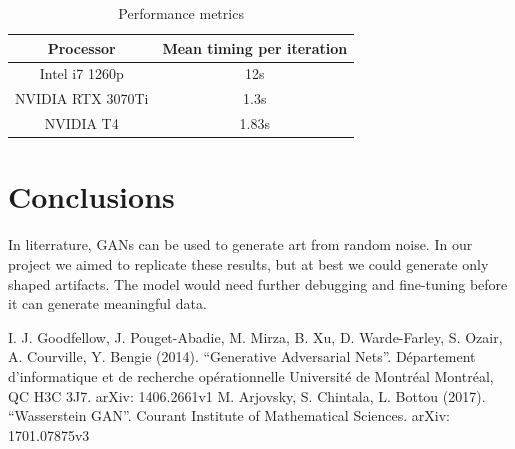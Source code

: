 \documentclass[conference]{IEEEtran}
\begin{document}
\begin{table}[!h]
    \centering
    \begin{tabular}{|c|c|}
        \hline
        Processor & Mean timing per iteration \\
        \hline
        Intel i7 1260p & 12s \\
        NVIDIA RTX 3070Ti & 1.3s \\
        NVIDIA T4 & 1.83s \\
        \hline
    \end{tabular}
    \caption{Performance metrics} \label{performance metrics}
\end{table}

\section{Conclusions}
    In literrature, GANs can be used to generate art from random noise. In our project we aimed to replicate these results,
but at best we could generate only shaped artifacts. The model would need further debugging and fine-tuning before it can
generate meaningful data.

\begin{thebibliography}{00}
     I. J. Goodfellow, J. Pouget-Abadie, M. Mirza, B. Xu, D. Warde-Farley, S. Ozair, A. Courville, Y. Bengie
    (2014). ``Generative Adversarial Nets''. Département d'informatique et de recherche opérationnelle Université de Montréal
    Montréal, QC H3C 3J7. arXiv: 1406.2661v1
     M. Arjovsky, S. Chintala, L. Bottou (2017). ``Wasserstein GAN''. Courant Institute of Mathematical Sciences.
    arXiv: 1701.07875v3
\end{thebibliography}
\end{document}
